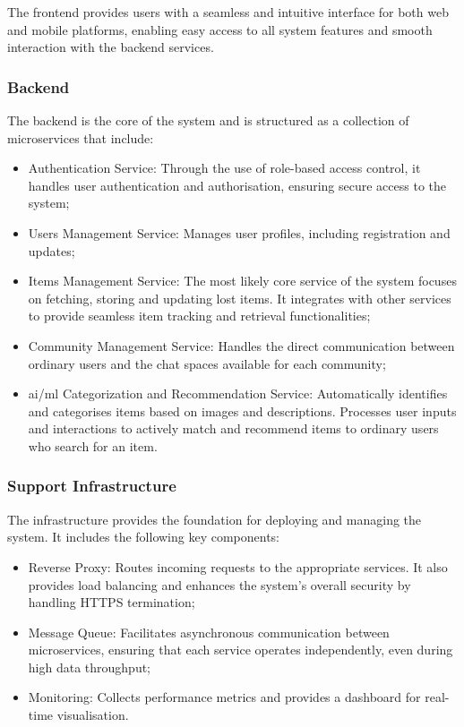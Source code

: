 The frontend provides users with a seamless and intuitive interface for both web and mobile platforms, enabling easy access to all system features and smooth interaction with the backend services.

\subsubsection{Backend}

The backend is the core of the system and is structured as a collection of microservices that include:

\begin{itemize}
    \item Authentication Service: Through the use of role-based access control, it handles user authentication and authorisation, ensuring secure access to the system;
    \item Users Management Service: Manages user profiles, including registration and updates;
    \item Items Management Service: The most likely core service of the system focuses on fetching, storing and updating lost items. It integrates with other services to provide seamless item tracking and retrieval functionalities;
    \item Community Management Service: Handles the direct communication between ordinary users and the chat spaces available for each community;
    \item \ac{ai}/\ac{ml} Categorization and Recommendation Service: Automatically identifies and categorises items based on images and descriptions. Processes user inputs and interactions to actively match and recommend items to ordinary users who search for an item.
\end{itemize}

\subsubsection{Support Infrastructure}

The infrastructure provides the foundation for deploying and managing the system. It includes the following key components:

\begin{itemize}
    \item Reverse Proxy: Routes incoming requests to the appropriate services. It also provides load balancing and enhances the system's overall security by handling HTTPS termination;
    \item Message Queue: Facilitates asynchronous communication between microservices, ensuring that each service operates independently, even during high data throughput;
    \item Monitoring: Collects performance metrics and provides a dashboard for real-time visualisation.
\end{itemize}

